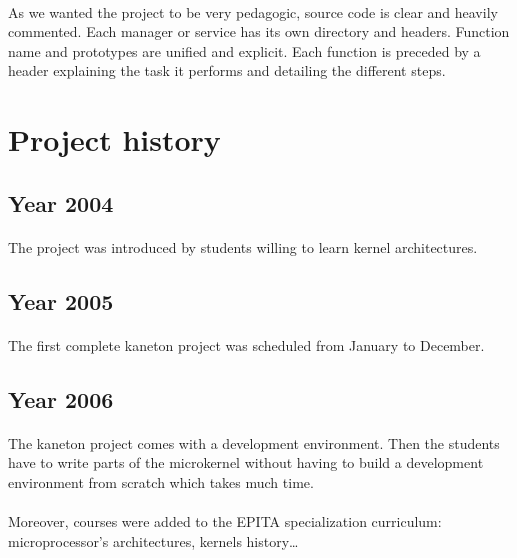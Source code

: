 \paragraph{}
As we wanted the project to be very pedagogic, \kaneton source code is
clear  and heavily  commented. Each  manager  or service  has its  own
directory and  headers. Function name  and prototypes are  unified and
explicit. Each function is preceded by a header explaining the task it
performs and detailing the different steps.

\section*{Project history}

\subsection*{Year 2004}

\paragraph{}
The  project  was  introduced  by  students willing  to  learn  kernel
architectures.

\subsection*{Year 2005}

\paragraph{}
The  first complete  kaneton  project was  scheduled  from January  to
December.

\subsection*{Year 2006}

\paragraph{}
The  kaneton project comes  with a  development environment.  Then the
students  have to  write parts  of the  microkernel without  having to
build a development environment from scratch which takes much time.

\paragraph{}
Moreover, courses  were added to the  EPITA specialization curriculum:
microprocessor's architectures, kernels history\ldots{}






